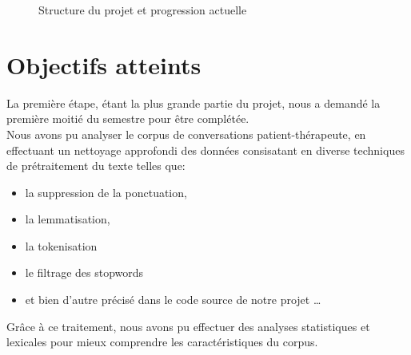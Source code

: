 \documentclass[12pt,a4paper]{article}
\begin{document}
\begin{figure}[H]
\begin{center}
\caption{\centering\small Structure du projet et progression actuelle}
\end{center}
\end{figure}

\pagebreak
\section{Objectifs atteints}

\hspace*{1cm}La première étape, étant la plus grande partie du projet, nous a demandé la première moitié du semestre pour être complétée.\\
Nous avons pu analyser le corpus de conversations patient-thérapeute, en effectuant un nettoyage approfondi des données consisatant en 
diverse techniques de prétraitement du texte telles que: 
\begin{itemize}
    \item la suppression de la ponctuation, 
    \item la lemmatisation, 
    \item la tokenisation 
    \item le filtrage des stopwords
    \item et bien d'autre précisé dans le code source de notre projet \dots
\end{itemize}
Grâce à ce traitement, nous avons pu effectuer des analyses statistiques et 
lexicales pour mieux comprendre les caractéristiques du corpus.\smallbreak
\end{document}
